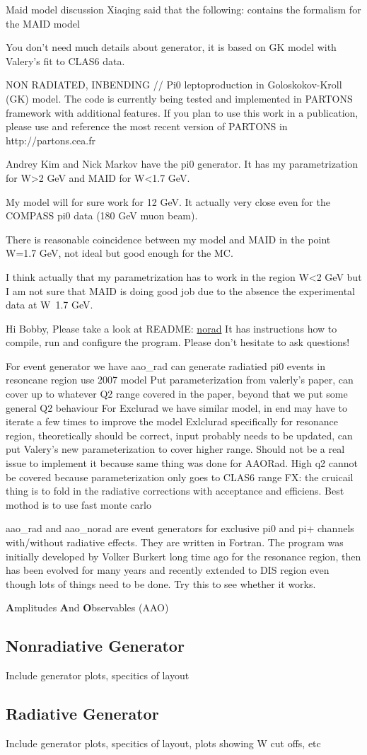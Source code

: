    Maid model discussion
    Xiaqing said that the following: \cite{Dreschsel1992ThresholdNucleons} contains the formalism for the MAID model

You don't need much details about generator, it is based on GK model with Valery's fit to CLAS6 data.

NON RADIATED, INBENDING
// Pi0 leptoproduction in Goloskokov-Kroll (GK) model. The code is currently being tested and implemented in PARTONS framework with additional features. If you plan to use this work in a publication, please use and reference the most recent version of PARTONS in http://partons.cea.fr 

Andrey Kim and Nick Markov have the pi0 generator. It has my parametrization for W>2 GeV and MAID for W<1.7 GeV.

My model will for sure work for 12 GeV. It actually very close even for the COMPASS pi0 data (180 GeV muon beam).

There is reasonable coincidence between my model and MAID in the point W=1.7 GeV, not ideal but good enough for the MC.

I think actually that my parametrization has to work in the region W<2 GeV but I am not sure that MAID is doing good job due to the absence the experimental data at W~1.7 GeV. 

    Hi Bobby,
    Please take a look at README:
    \href{https://github.com/drewkenjo/aao\_norad}{norad}
    It has instructions how to compile, run and configure the program.
    Please don't hesitate to ask questions!


    For event generator we have aao\_rad can generate radiatied pi0 events in resoncane region use 2007 model
    Put parameterization from valerly’s paper, can cover up to whatever Q2 range covered in the paper, beyond that we put some general Q2 behaviour
    For Exclurad we have similar model, in end may have to iterate a few times to improve the model
    Exlclurad specifically for resonance region, theoretically should be correct, input probably needs to be updated, can put Valery’s new parameterization to cover higher range. Should not be a real issue to implement it because same thing was done for AAORad. High q2 cannot be covered because parameterization only goes to CLAS6 range
    FX: the cruicail thing is to fold in the radiative corrections with acceptance and efficiens. Best mothod is to use fast monte carlo


    aao\_rad and aao\_norad are event generators for exclusive pi0 and pi+ channels with/without radiative effects.  They are written in Fortran.  The program was initially developed by Volker Burkert long time ago for the resonance region, then has been evolved for many years and recently extended to DIS region even though lots of things need to be done.  Try this to see whether it works.  

    \textbf{A}mplitudes \textbf{A}nd \textbf{O}bservables (AAO)
    \subsection{Nonradiative Generator}
        Include generator plots, specitics of layout
        
    \subsection{Radiative Generator}
      Include generator plots, specitics of layout, plots showing W cut offs, etc
